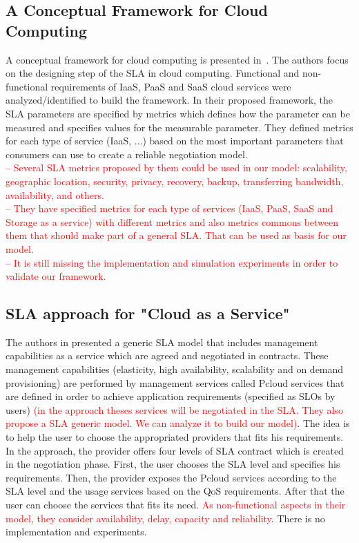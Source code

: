 \documentclass[12pt,a4paper,oneside]{article}
\begin{document}
\subsection{A Conceptual Framework for Cloud Computing}

A conceptual framework for cloud computing is presented in~\cite{005}. The authors focus on the designing step of the SLA in cloud computing. Functional and non-functional requirements of IaaS, PaaS and SaaS cloud services were analyzed/identified to build the framework. In their proposed framework, the SLA parameters are specified by metrics which defines how the parameter can be measured and specifies values for the measurable parameter. They defined metrics for each type of service (IaaS, ...) based on the most important parameters that consumers can use to create a reliable negotiation model. \\ 
\textcolor{red}{-- Several SLA metrics proposed by them could be used in our model: scalability, geographic location, security, privacy, recovery, backup, transferring bandwidth, availability, and others. \\
-- They have specified metrics for each type of services (IaaS, PaaS, SaaS and Storage as a service) with different metrics and also metrics commons between them that should make part of a general SLA. That can be used as basis for our model.\\
-- It is still missing the implementation and simulation experiments in order to validate our framework.}

\subsection{SLA approach for "Cloud as a Service"}

The authors in \cite{009} presented a generic SLA model that includes management capabilities as a service which are agreed and negotiated in contracts. These management capabilities (elasticity, high availability, scalability and on demand provisioning) are performed by management services called Pcloud services that are defined in order to achieve application requirements (specified as SLOs by users) \textcolor{red}{(in the approach theses services will be negotiated in the SLA. They also propose a SLA generic model. We can analyze it to build our model)}. The idea is to help the user to choose the appropriated providers that fits his requirements. In the approach, the provider offers four levels of SLA contract which is created in the negotiation phase. First, the user chooses the SLA level and specifies his requirements. Then, the provider exposes the Pcloud services according to the SLA level and the usage services based on the QoS requirements. After that the user can choose the services that fits its need. \textcolor{red}{As non-functional aspects in their model, they consider availability, delay, capacity and reliability}. There is no implementation and experiments.
\end{document}
